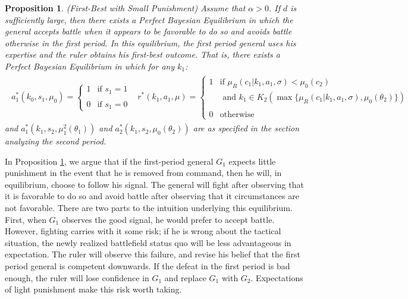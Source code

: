 \documentclass[11pt,]{article}
\newtheorem{proposition}[]{Proposition}
\begin{document}
\begin{proposition} (First-Best with Small Punishment)  Assume that $\alpha>0$.  If $d$ is sufficiently large, then there exists a Perfect Bayesian Equilibrium in which the general accepts battle when it appears to be favorable to do so and avoids battle otherwise in the first period.  In this equilibrium, the first period general uses his expertise and the ruler obtains his first-best outcome.  That is, there exists a Perfect Bayesian Equilibrium in which for any $k_1$:
\begin{align*} 
\begin{array}{cc}
a_1^*(k_0,s_1,\mu_0)=\left\{\begin{array}{ll}
1&\mbox{if }s_1=1\\
&\\
0&\mbox{if }s_1=0
\end{array}\right.&
r^*(k_1,a_1,\mu)=\left\{\begin{array}{ll}
1&\mbox{if }\mu_R(c_1|k_1,a_1,\sigma)<\mu_0(c_2)\\
&\mbox{ and }k_1\in K_2(\max\{\mu_R(c_1|k_1,a_1,\sigma),\mu_0(\theta_2)\})\\
&\\
0&\mbox{otherwise}
\end{array}\right.
\end{array}
\end{align*}
and $a^*_1(k_1,s_2,\mu_1^2(\theta_1))$ and $a_2^*(k_1,s_2,\mu_0(\theta_2))$ are as specified in the section analyzing the second period.\label{if d is large the ruler can get his first-best}
\end{proposition}\noindent In Proposition \ref{if d is large the ruler can get his first-best}, we argue that if the first-period general $G_1$ expects little punishment in the event that he is removed from command, then he will, in equilibrium, choose to follow his signal.  The general will fight after observing that it is favorable to do so and avoid battle after observing that it circumstances are not favorable.  There are two parts to the intuition underlying this equilibrium.  First, when $G_1$ observes the good signal, he would prefer to accept battle.  However, fighting carries with it some risk; if he is wrong about the tactical situation, the newly realized battlefield status quo will be less advantageous in expectation.  The ruler will observe this failure, and revise his belief that the first period general is competent downwards.  If the defeat in the first period is bad enough, the ruler will lose confidence in $G_1$ and replace $G_1$ with $G_2$.  Expectations of light punishment make this risk worth taking.  
\end{document}
